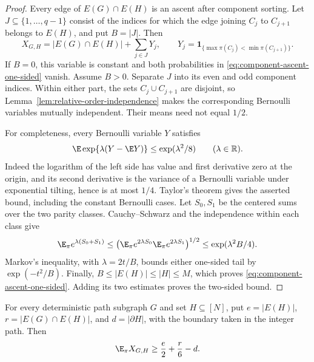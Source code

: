 \begin{proof}
Every edge of \(E(G)\cap E(H)\) is an ascent after component
sorting.  Let \(J\subseteq\{1,\ldots,q-1\}\) consist of the
indices for which the edge joining \(C_j\) to \(C_{j+1}\) belongs
to \(E(H)\), and put \(B=|J|\).  Then
\[
  X_{G,H}=|E(G)\cap E(H)|+\sum_{j\in J}Y_j,
  \qquad
  Y_j=\mathbf 1_{\{\max\pi(C_j)<\min\pi(C_{j+1})\}}.
\]
If \(B=0\), this variable is constant and both probabilities in
\eqref{eq:component-ascent-one-sided} vanish.  Assume \(B>0\).
Separate \(J\) into its even and odd component indices.  Within
either part, the sets \(C_j\cup C_{j+1}\) are disjoint, so
Lemma~\ref{lem:relative-order-independence} makes the corresponding
Bernoulli variables mutually independent.  Their means need not equal
\(1/2\).

For completeness, every Bernoulli variable \(Y\) satisfies
\[
  \E\exp\{\lambda(Y-\E Y)\}\le\exp(\lambda^2/8)
  \qquad(\lambda\in\mathbb R).
\]
Indeed the logarithm of the left side has value and first derivative
zero at the origin, and its second derivative is the variance of a
Bernoulli variable under exponential tilting, hence is at most \(1/4\).
Taylor's theorem gives the asserted bound, including the constant
Bernoulli cases.  Let \(S_0,S_1\) be the centered sums over the two
parity classes.  Cauchy--Schwarz and the independence within each class
give
\[
  \E_\pi e^{\lambda(S_0+S_1)}
  \le
  \bigl(\E_\pi e^{2\lambda S_0}
        \E_\pi e^{2\lambda S_1}\bigr)^{1/2}
  \le \exp(\lambda^2B/4).
\]
Markov's inequality, with \(\lambda=2t/B\), bounds either one-sided
tail by \(\exp(-t^2/B)\).  Finally,
\(B\le|E(H)|\le|H|\le M\), which proves
\eqref{eq:component-ascent-one-sided}.  Adding its two estimates proves
the two-sided bound.
\end{proof}

\begin{lemma}
\label{lem:component-ascent-expectation}
For every deterministic path subgraph \(G\) and set \(H\subseteq[N]\),
put \(e=|E(H)|\), \(r=|E(G)\cap E(H)|\), and
\(d=|\partial H|\), with the boundary taken in the integer path.
Then
\begin{equation}
\label{eq:component-ascent-expectation}
  \E_\pi X_{G,H}\ge \frac e2+\frac r6-d.
\end{equation}
\end{lemma}

